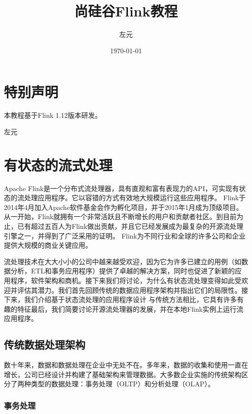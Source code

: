 \documentclass[cn,11pt,chinese]{elegantbook}
\title{尚硅谷Flink教程}
\author{左元}
\institute{尚硅谷大数据组}
\date{\today}
\begin{document}
\maketitle
\frontmatter

\chapter*{特别声明}

本教程基于Flink 1.12版本研发。

\vskip 1.5cm

\begin{flushright}
左元
\end{flushright}

\tableofcontents

\mainmatter

\chapter{有状态的流式处理}

Apache Flink是一个分布式流处理器，具有直观和富有表现力的API，可实现有状态的流处理应用程序。它以容错的方式有效地大规模运行这些应用程序。 Flink于2014年4月加入Apache软件基金会作为孵化项目，并于2015年1月成为顶级项目。从一开始，Flink就拥有一个非常活跃且不断增长的用户和贡献者社区。到目前为止，已有超过五百人为Flink做出贡献，并且它已经发展成为最复杂的开源流处理引擎之一，并得到了广泛采用的证明。 Flink为不同行业和全球的许多公司和企业提供大规模的商业关键应用。

流处理技术在大大小小的公司中越来越受欢迎，因为它为许多已建立的用例（如数据分析，ETL和事务应用程序）提供了卓越的解决方案，同时也促进了新颖的应用程序，软件架构和商机。接下来我们将讨论，为什么有状态流处理变得如此受欢迎并评估其潜力。我们首先回顾传统的数据应用程序架构并指出它们的局限性。接下来，我们介绍基于状态流处理的应用程序设计 与传统方法相比，它具有许多有趣的特征最后，我们简要讨论开源流处理器的发展，并在本地Flink实例上运行流应用程序。

\section{传统数据处理架构}

数十年来，数据和数据处理在企业中无处不在。多年来，数据的收集和使用一直在增长，公司已经设计并构建了基础架构来管理数据。大多数企业实施的传统架构区分了两种类型的数据处理：事务处理（OLTP）和分析处理（OLAP）。

\subsection{事务处理}
\end{document}
